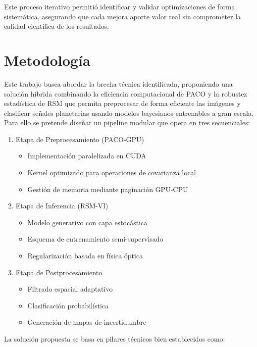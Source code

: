Este proceso iterativo permitió identificar y validar optimizaciones de forma sistemática, asegurando que cada mejora aporte valor real sin comprometer la calidad científica de los resultados.

\section{Metodología}
Este trabajo busca abordar la brecha técnica identificada, proponiendo una solución híbrida combinando la eficiencia computacional de PACO y la robustez estadística de RSM que permita preprocesar de forma eficiente las imágenes y clasificar señales planetarias usando modelos bayesianos entrenables a gran escala. Para ello se pretende diseñar un pipeline modular que opera en tres secuenciales:
\begin{enumerate}
    \item Etapa de Preprocesamiento (PACO-GPU)
        \begin{itemize}
        \item Implementación paralelizada en CUDA \cite{7482491}
        \item Kernel optimizado para operaciones de covarianza local
        \item Gestión de memoria mediante paginación GPU-CPU
        \end{itemize}
    \item Etapa de Inferencia (RSM-VI)
        \begin{itemize}
        \item Modelo generativo con capa estocástica
        \item Esquema de entrenamiento semi-supervisado
        \item Regularización basada en física óptica
        \end{itemize}
    \item Etapa de Postprocesamiento   
        \begin{itemize}
        \item Filtrado espacial adaptativo
        \item Clasificación probabilística
        \item Generación de mapas de incertidumbre
        \end{itemize}
\end{enumerate}
La solución propuesta se basa en pilares técnicos bien establecidos como:\\
